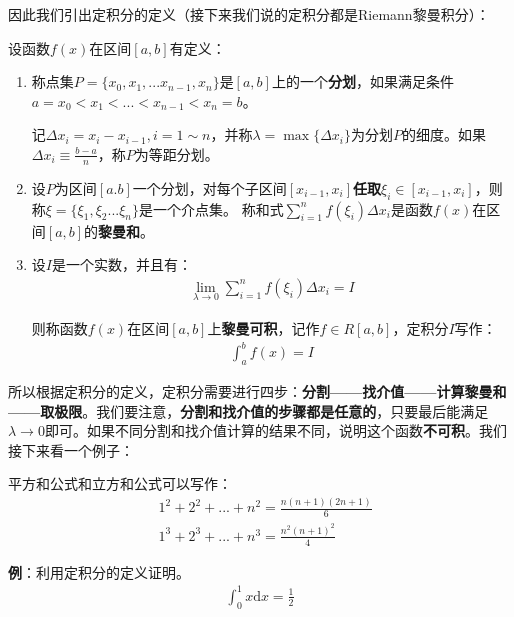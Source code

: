 \documentclass{ctexart}
\let\oldtextbf\textbf %
\renewcommand{\textbf}[1]{\textcolor{btex}{\oldtextbf{#1}}} %
\begin{document}
因此我们引出定积分的定义（接下来我们说的定积分都是Riemann黎曼积分）：
\begin{tcolorbox}[
    colback=bac2,     %
    colframe=fra2,   %
    coltitle=white,             %
    coltext=tex2,
    title=Riemann定积分的定义,
    fonttitle=\bfseries,        %
arc=3mm,                     %
breakable
]
设函数$f(x)$在区间$[a,b]$有定义：
\begin{enumerate}
    \item 称点集$P=\{x_0,x_1,...x_{n-1},x_n\}$是$[a,b]$上的一个\textbf{分划}，如果满足条件$a=x_0<x_1<...<x_{n-1}<x_n=b$。

    记$\Delta x_i=x_i-x_{i-1},i=1\sim n$，并称$\lambda=\max\{\Delta x_i\}$为分划$P$的细度。如果$\Delta x_i\equiv \frac{b-a}{n}$，称$P$为等距分划。

    \item 设$P$为区间$[a.b]$一个分划，对每个子区间$[x_{i-1},x_i]$\textbf{任取}$\xi_i\in[x_{i-1},x_i]$，则称$\xi=\{\xi_1,\xi_2...\xi_n\}$是一个介点集。 称和式$\sum_{i=1}^n f(\xi_i)\Delta x_i$是函数$f(x)$在区间$[a,b]$的\textbf{黎曼和}。

    \item 设$I$是一个实数，并且有：
    \begin{align}
        \lim_{\lambda\to 0}\sum_{i=1}^n f(\xi_i)\Delta x_i=I
    \end{align}

    则称函数$f(x)$在区间$[a,b]$上\textbf{黎曼可积}，记作$f\in R[a,b]$，定积分$I$写作：
    \begin{align*}
        \int _a^b f(x)=I
    \end{align*}
\end{enumerate}
\end{tcolorbox}

所以根据定积分的定义，定积分需要进行四步：\textbf{分割——找介值——计算黎曼和——取极限}。我们要注意，\textbf{分割和找介值的步骤都是任意的}，只要最后能满足$\lambda\to 0$即可。如果不同分割和找介值计算的结果不同，说明这个函数\textbf{不可积}。我们接下来看一个例子：

\begin{tcolorbox}[
    colback=bac1,     %
    colframe=fra1,   %
    coltitle=white,             %
    coltext=tex1,
    title=用到的求和公式,
    fonttitle=\bfseries,        %
arc=3mm,                     %
breakable
]
平方和公式和立方和公式可以写作：
\begin{align*}
    &1^2+2^2+...+n^2=\frac{n(n+1)(2n+1)}{6}\\
    &1^3+2^3+...+n^3=\frac{n^2(n+1)^2}{4}\tag{5-1}
\end{align*}
\end{tcolorbox}
\textbf{例}：利用定积分的定义证明。
\begin{align*}
    \int_0^1 x\mathrm{d}x=\frac{1}{2}
\end{align*}
\end{document}
